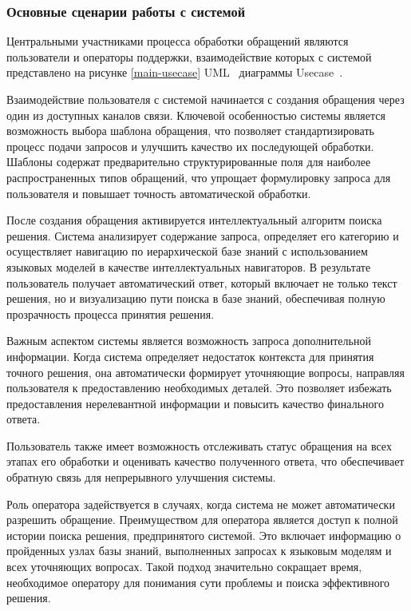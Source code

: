 \subsubsection{Основные сценарии работы с системой}

Центральными участниками процесса обработки обращений являются пользователи и операторы поддержки, взаимодействие которых с системой представлено на рисунке \ref{main-usecase} UML~\cite{Uml} диаграммы Usecase~\cite{Usecase}.


Взаимодействие пользователя с системой начинается с создания обращения через один из доступных каналов связи. Ключевой особенностью системы является возможность выбора шаблона обращения, что позволяет стандартизировать процесс подачи запросов и улучшить качество их последующей обработки. Шаблоны содержат предварительно структурированные поля для наиболее распространенных типов обращений, что упрощает формулировку запроса для пользователя и повышает точность автоматической обработки.

После создания обращения активируется интеллектуальный алгоритм поиска решения. Система анализирует содержание запроса, определяет его категорию и осуществляет навигацию по иерархической базе знаний с использованием языковых моделей в качестве интеллектуальных навигаторов. В результате пользователь получает автоматический ответ, который включает не только текст решения, но и визуализацию пути поиска в базе знаний, обеспечивая полную прозрачность процесса принятия решения.

Важным аспектом системы является возможность запроса дополнительной информации. Когда система определяет недостаток контекста для принятия точного решения, она автоматически формирует уточняющие вопросы, направляя пользователя к предоставлению необходимых деталей. Это позволяет избежать предоставления нерелевантной информации и повысить качество финального ответа.

Пользователь также имеет возможность отслеживать статус обращения на всех этапах его обработки и оценивать качество полученного ответа, что обеспечивает обратную связь для непрерывного улучшения системы.

Роль оператора задействуется в случаях, когда система не может автоматически разрешить обращение. Преимуществом для оператора является доступ к полной истории поиска решения, предпринятого системой. Это включает информацию о пройденных узлах базы знаний, выполненных запросах к языковым моделям и всех уточняющих вопросах. Такой подход значительно сокращает время, необходимое оператору для понимания сути проблемы и поиска эффективного решения.

